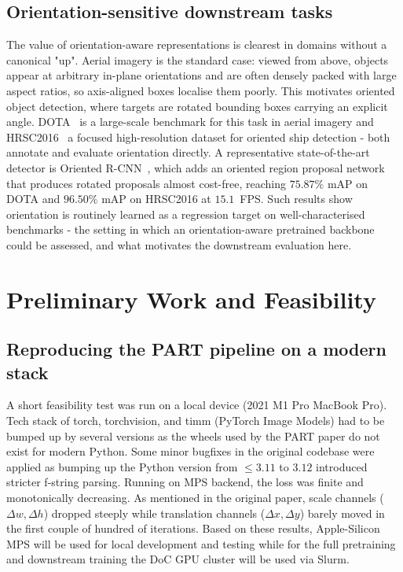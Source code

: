 \documentclass[11pt,a4paper]{report}
\begin{document}
\section{Orientation-sensitive downstream tasks}
The value of orientation-aware representations is clearest in domains without a canonical "up". Aerial imagery is the standard case: viewed from above, objects appear at arbitrary in-plane orientations and are often densely packed with large aspect ratios, so axis-aligned boxes localise them poorly. This motivates oriented object detection, where targets are rotated bounding boxes carrying an explicit angle. DOTA~\cite{dota} is a large-scale benchmark for this task in aerial imagery and HRSC2016~\cite{hrsc2016} a focused high-resolution dataset for oriented ship detection - both annotate and evaluate orientation directly. A representative state-of-the-art detector is Oriented R-CNN~\cite{orcnn}, which adds an oriented region proposal network that produces rotated proposals almost cost-free, reaching $75.87\%$ mAP on DOTA and $96.50\%$ mAP on HRSC2016 at $15.1$~FPS. Such results show orientation is routinely learned as a regression target on well-characterised benchmarks - the setting in which an orientation-aware pretrained backbone could be assessed, and what motivates the downstream evaluation here.

\chapter{Preliminary Work and Feasibility}

\section{Reproducing the PART pipeline on a modern stack}
A short feasibility test was run on a local device (2021 M1 Pro MacBook Pro). Tech stack of torch, torchvision, and timm (PyTorch Image Models) had to be bumped up by several versions as the wheels used by the PART paper do not exist for modern Python. Some minor bugfixes in the original codebase were applied as bumping up the Python version from $\leq 3.11$ to $3.12$ introduced stricter f-string parsing. Running on MPS backend, the loss was finite and monotonically decreasing. As mentioned in the original paper, scale channels ($\Delta w, \Delta h$) dropped steeply while translation channels ($\Delta x, \Delta y$) barely moved in the first couple of hundred of iterations. Based on these results, Apple-Silicon MPS will be used for local development and testing while for the full pretraining and downstream training the DoC GPU cluster will be used via Slurm.
\end{document}
